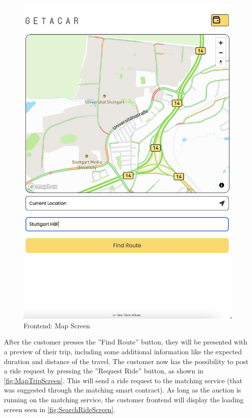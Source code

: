 \begin{figure}[H]
\begin{minipage}{0.45\linewidth}
        \includegraphics[width=\linewidth]{data/ffss/2.png}
        \caption{Frontend: Map Screen}
        \label{fig:MapScreen}
    \end{minipage}
    
\end{figure}

After the customer presses the ''Find Route'' button, they will be presented with a preview of their trip, including some additional information like the expected duration and distance of the travel. The customer now has the possibility to post a ride request by pressing the ''Request Ride'' button, as shown in \ref{fig:MapTripScreen}.
This will send a ride request to the matching service (that was suggested through the matching smart contract). As long as the auction is running on the matching service, the customer frontend will display the loading screen seen in \ref{fig:SearchRideScreen}.


